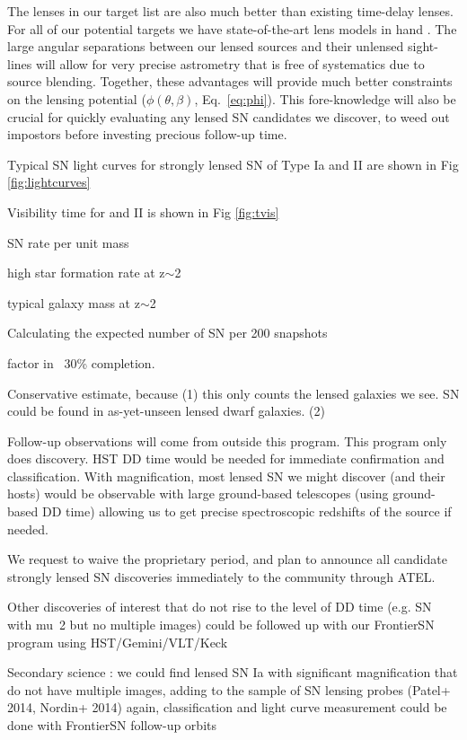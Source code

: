 The lenses in our target list are also much better than existing
time-delay lenses.  For all of our potential targets we have
state-of-the-art lens models in
hand \citep[e.g.][]{Zitrin:2011a,Zitrin:2011b,Zitrin:2012a,Zitrin:2012b,Zitrin:2013}.
The large angular separations between our lensed sources and their
unlensed sight-lines will allow for very precise astrometry that is
free of systematics due to source blending.  Together, these
advantages will provide much better constraints on the lensing
potential ($\phi(\theta,\beta)$, Eq.~\ref{eq:phi}).  This
fore-knowledge will also be crucial for quickly evaluating any lensed
SN candidates we discover, to weed out impostors before investing
precious follow-up time.


\medskip
{}

Typical SN light curves for strongly lensed SN of Type Ia and II are shown in Fig \ref{fig:lightcurves}

Visibility time for \SNIa and II is shown in Fig \ref{fig:tvis}

SN rate per unit mass \citep{Mannucci:2005}

high star formation rate at z$\sim$2

typical galaxy mass at z$\sim$2

Calculating the expected number of SN per 200 snapshots

factor in ~30\% completion.

Conservative estimate, because  
 (1) this only counts the lensed galaxies we see.  SN could be found
 in as-yet-unseen lensed dwarf galaxies. 
 (2) 



Follow-up observations will come from outside this program. 
This program only does discovery.
HST DD time would be needed for immediate confirmation and classification.
With magnification, most lensed SN we might discover (and their hosts)
would be observable with large ground-based telescopes (using
ground-based DD time)   allowing us to get precise spectroscopic
redshifts of the source if needed.

We request to waive the proprietary period, and plan to announce all
     candidate strongly lensed SN discoveries immediately to the
     community through ATEL.

Other discoveries of interest that do not rise to the level of DD time (e.g. SN with mu~2 but no multiple images) could be followed up with our FrontierSN program using HST/Gemini/VLT/Keck




Secondary science : 
    we could find lensed SN Ia with significant magnification that do not have multiple images, adding to the sample of SN lensing probes (Patel+ 2014, Nordin+ 2014)
      again, classification and light curve measurement could be done with FrontierSN follow-up orbits











